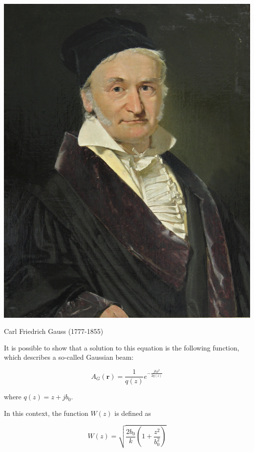 \begin{marginfigure}[-5cm]
\includegraphics{hermite/figures/c_gauss}
\caption{Carl Friedrich Gauss (1777-1855)}
\end{marginfigure}

It is possible to show that a solution to this equation is the following function, which describes a so-called Gaussian beam:

\begin{equation}
A_G({\mathbf r}) = \frac{1}{q(z)}e^{-\frac{jk\rho^2}{2q(z)}} \label{eq-gauss}
\end{equation}   

where $q(z)=z+jb_0$. 

In this context, the function $W(z)$ is defined as

\begin{equation}
W(z)=\sqrt{\frac{2 b_0}{k} \left(1 + \frac{z^2}{b_0^2}\right)} \label{eq-W}
\end{equation} 

